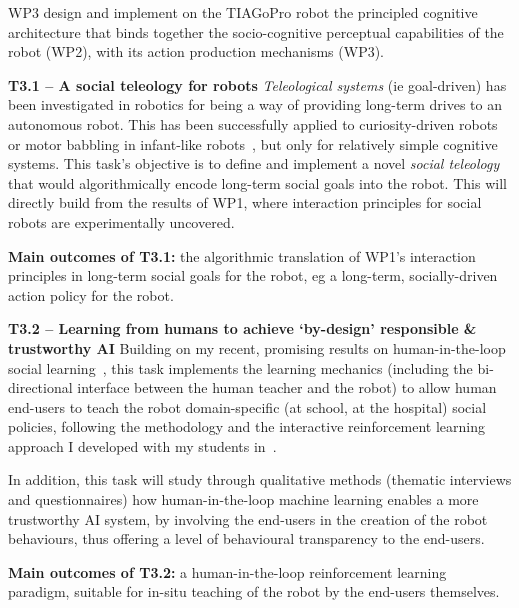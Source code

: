 \begin{rewrite}

WP3 design and implement on the TIAGoPro robot the principled cognitive architecture
that binds together the socio-cognitive perceptual capabilities of the robot
(WP2), with its action production mechanisms (WP3).

\textbf{T3.1 -- A social teleology for robots}
\emph{Teleological systems} (ie goal-driven) has been investigated in robotics
for being a way of providing long-term drives to an autonomous robot. This has
been successfully applied to curiosity-driven robots~\cite{oudeyer2005playground} or motor babbling in infant-like
robots~\cite{forestier2017unified}, but only for relatively simple cognitive
systems. This task's objective is to define and implement a novel \emph{social teleology} that would
algorithmically encode long-term social goals into the robot. This will directly
build from the results of WP1, where interaction principles for social robots
are experimentally uncovered.

\begin{framed}
    {\noindent\bf Main outcomes of T3.1:} the algorithmic translation of WP1's
    interaction principles in long-term social goals for the robot, eg a
    long-term, socially-driven action policy for the robot.
\end{framed}

\textbf{T3.2 -- Learning from humans to achieve `by-design' responsible \&
trustworthy AI}
Building on my recent, promising results on human-in-the-loop
social learning~\cite{senft2019teaching,winkle2020couch}, this task
implements the learning mechanics (including the bi-directional interface
between the human teacher and the robot) to allow human end-users to
teach the robot domain-specific (at school, at the hospital) social policies,
following the methodology and the interactive reinforcement learning approach I
developed with my students in~\cite{senft2017supervised}.

In addition, this task will study through qualitative methods (thematic
interviews and questionnaires) how human-in-the-loop machine learning enables a more
trustworthy AI system, by involving the end-users in the creation of the robot
behaviours, thus offering a level of behavioural transparency to the end-users.

\begin{framed}
    {\noindent\bf Main outcomes of T3.2:} a human-in-the-loop reinforcement
    learning paradigm, suitable for in-situ teaching of the robot by the
    end-users themselves.
\end{framed}


\end{rewrite}
